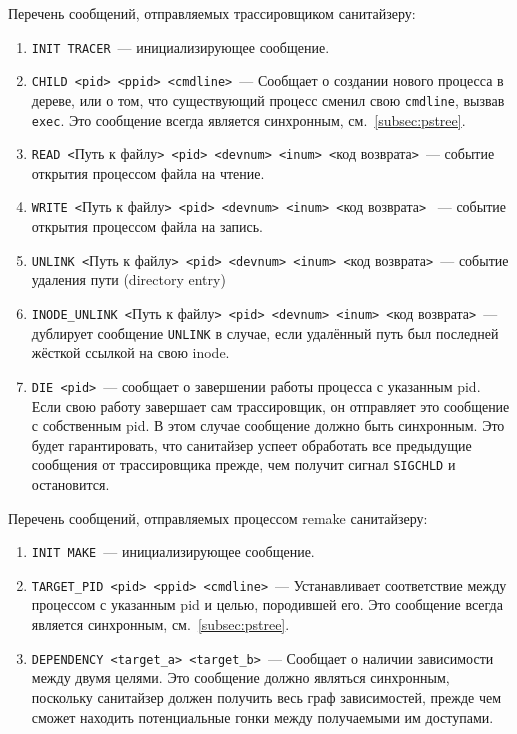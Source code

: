 Перечень сообщений, отправляемых трассировщиком санитайзеру:

\begin{enumerate}
    \item \texttt{INIT TRACER}~--- инициализирующее сообщение.
    \item \texttt{CHILD <pid> <ppid> <cmdline>}~--- Сообщает о создании нового процесса в дереве, или о том, что существующий процесс сменил свою \texttt{cmdline}, вызвав \texttt{exec}. Это сообщение всегда является синхронным, см.~\ref{subsec:pstree}.
    \item \texttt{READ <}Путь к файлу\texttt{> <pid> <devnum> <inum> <}код возврата\texttt{>}~--- событие открытия процессом файла на чтение.
    \item \texttt{WRITE <}Путь к файлу\texttt{> <pid> <devnum> <inum> <}код возврата\texttt{>}
    ~--- событие открытия процессом файла на запись.
    \item \texttt{UNLINK <}Путь к файлу\texttt{> <pid> <devnum> <inum> <}код возврата\texttt{>}~--- событие удаления пути (directory entry)
    \item \texttt{INODE\_UNLINK <}Путь к файлу\texttt{> <pid> <devnum> <inum> <}код возврата\texttt{>}~--- дублирует сообщение \texttt{UNLINK} в случае, если удалённый путь был последней жёсткой ссылкой на свою inode.
    \item \texttt{DIE <pid>}~--- сообщает о завершении работы процесса с указанным pid. Если свою работу завершает сам трассировщик, он отправляет это сообщение с собственным pid. В этом случае сообщение должно быть синхронным. Это будет гарантировать, что санитайзер успеет обработать все предыдущие сообщения от трассировщика прежде, чем получит сигнал \texttt{SIGCHLD} и остановится.
\end{enumerate}

Перечень сообщений, отправляемых процессом remake санитайзеру:

\begin{enumerate}
    \item \texttt{INIT MAKE}~--- инициализирующее сообщение.
    \item \texttt{TARGET\_PID <pid> <ppid> <cmdline>}~--- Устанавливает соответствие между процессом с указанным pid и целью, породившей его. Это сообщение всегда является синхронным, см.~\ref{subsec:pstree}.
    \item \texttt{DEPENDENCY <target\_a> <target\_b>}~--- Сообщает о наличии зависимости между двумя целями. Это сообщение должно являться синхронным, поскольку санитайзер должен получить весь граф зависимостей, прежде чем сможет находить потенциальные гонки между получаемыми им доступами.
\end{enumerate}

